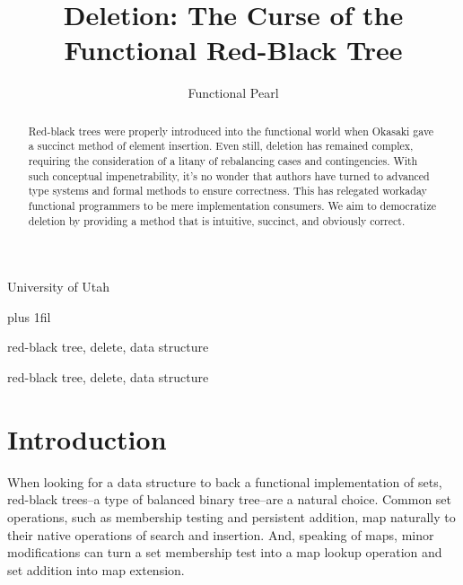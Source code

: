 \documentclass[preprint]{sigplanconf}
\begin{document}
\copyrightdata{[to be supplied]} 


\title{Deletion: The Curse of the Functional Red-Black Tree}
\subtitle{Functional Pearl}

           {University of Utah}

\maketitle


\rightcodeskip=0pt plus 1fil 

\begin{abstract}
Red-black trees were properly introduced into the functional world when Okasaki gave a succinct method of element insertion. Even still, deletion has remained complex, requiring the consideration of a litany of rebalancing cases and contingencies. With such conceptual impenetrability, it's no wonder that authors have turned to advanced type systems and formal methods to ensure correctness. This has relegated workaday functional programmers to be mere implementation consumers. We aim to democratize deletion by providing a method that is intuitive, succinct, and obviously correct.
\end{abstract}


\terms
red-black tree, delete, data structure

\keywords
red-black tree, delete, data structure

\section{Introduction}

When looking for a data structure to back a functional implementation of sets, red-black trees--a type of balanced binary tree--are a natural choice. Common set operations, such as membership testing and persistent addition, map naturally to their native operations of search and insertion. And, speaking of maps, minor modifications can turn a set membership test into a map lookup operation and set addition into map extension.
\end{document}
